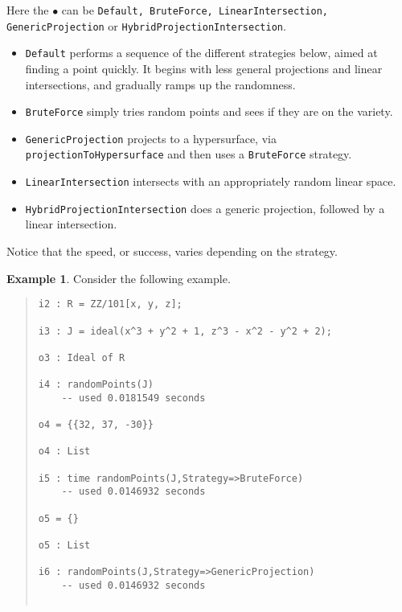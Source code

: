\documentclass[11pt]{amsart}
\theoremstyle{definition}
\newtheorem{example}{Example}[section]
\begin{document}
    \begin{description}%
        \setlength{\itemsep}{5pt}
    \item[\tt Strategy => $\bullet$]   Here the $\bullet$ can be {\tt Default, BruteForce, LinearIntersection, \\ GenericProjection} or {\tt HybridProjectionIntersection}.

    \begin{itemize}
    \item {\tt Default} performs a sequence of the different strategies below, aimed at finding a point quickly.  It begins with less general projections and linear intersections, and gradually ramps up the randomness.  
    \item {\tt BruteForce} simply tries random points and sees if they are on the variety.
        
    \item {\tt GenericProjection} projects to a hypersurface, via 
        {\tt projectionToHypersurface} and then uses a {\tt BruteForce} strategy.
        
    \item {\tt LinearIntersection} intersects with an appropriately random linear space.
        
    \item {\tt HybridProjectionIntersection} does a generic projection, followed by a linear intersection. 		
    \end{itemize}

    Notice that the speed, or success, varies depending on the strategy.

    \begin{example}\label{BruteForce}
        Consider the following example.
        ~~        
        {\small\color{blue}
    \begin{quote}
\begin{verbatim}
i2 : R = ZZ/101[x, y, z];

i3 : J = ideal(x^3 + y^2 + 1, z^3 - x^2 - y^2 + 2);

o3 : Ideal of R

i4 : randomPoints(J)
    -- used 0.0181549 seconds

o4 = {{32, 37, -30}}

o4 : List

i5 : time randomPoints(J,Strategy=>BruteForce)
    -- used 0.0146932 seconds

o5 = {}

o5 : List

i6 : randomPoints(J,Strategy=>GenericProjection)
    -- used 0.0146932 seconds


\end{verbatim}
\end{quote}}
\end{example}
\end{description}
\end{document}
